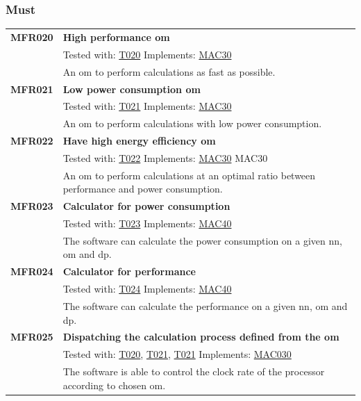 \documentclass[parskip=full]{scrartcl}
\begin{document}
\subsubsection{Must}
\begin{tabular}{p{2cm}p{11.4cm}}
\textbf{MFR020} \hypertarget{MFR020} & \textbf{High \gls{performance} \gls{om}}\\         
& Tested with: \hyperlink{T020}{T020} Implements: \hyperlink{MAC30}{MAC30} \\                           
& An \gls{om} to perform calculations as fast as possible.\\
\textbf{MFR021} \hypertarget{MFR021}& \textbf{Low \gls{power consumption} \gls{om}}\\ 
& Tested with: \hyperlink{T021}{T021} Implements: \hyperlink{MAC30}{MAC30} \\                                   
& An \gls{om} to perform calculations with low \gls{power consumption}.\\
\textbf{MFR022} \hypertarget{MFR022}& \textbf{Have high energy efficiency \gls{om}}\\      
& Tested with: \hyperlink{T022}{T022}  Implements: \hyperlink{MAC30}{MAC30} MAC30 \\                              
& An \gls{om} to perform calculations at an optimal ratio between \gls{performance} and \gls{power consumption}.\\
\textbf{MFR023}\hypertarget{MFR023} & \textbf{Calculator for \gls{power consumption}}\\ & Tested with: \hyperlink{T023}{T023} Implements:  \hyperlink{MAC40}{MAC40} \\                                   
& The software can calculate the \gls{power consumption} on a given \gls{nn}, \gls{om} and \gls{dp}.\\
\textbf{MFR024}\hypertarget{MFR024} & \textbf{Calculator for \gls{performance}}\\
& Tested with: \hyperlink{T024}{T024} Implements: \hyperlink{MAC40}{MAC40} \\                                    
& The software can calculate the \gls{performance} on a given \gls{nn}, \gls{om} and \gls{dp}.\\
\textbf {MFR025} \hypertarget{MFR025}& \textbf{Dispatching the calculation process defined from the \gls{om}}\\
& Tested with: \hyperlink{T020}{T020}, \hyperlink{T021}{T021}, \hyperlink{T021}{T021} Implements: \hyperlink{MAC30}{MAC030}\\
& The software is able to control the clock rate of the processor according to chosen \gls{om}. \\
\end{tabular}
\end{document}
